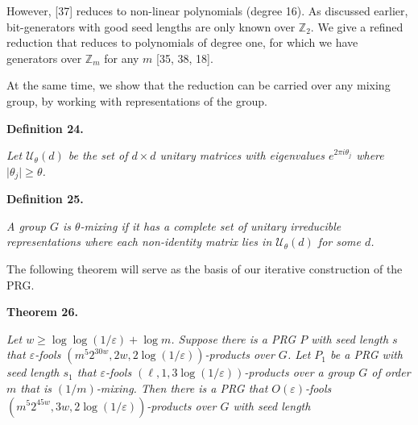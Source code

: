 \documentclass[10pt,a4paper]{article}
\begin{document}
However, [37] reduces to non-linear polynomials (degree 16). As discussed earlier, bit-generators with good seed lengths are only known over $\mathbb{Z}_{2}$. We give a refined reduction that reduces to polynomials of degree one, for which we have generators over $\mathbb{Z}_{m}$ for any $m$ [35, 38, 18].\par




At the same time, we show that the reduction can be carried over any mixing group, by working with representations of the group.\par





\par\medskip\noindent\textbf{
\textbf{Definition 24}\textbf{.}
}\par



\emph{Let $\mathcal{U}_{\theta}(d)$ be the set of $d\times d$ unitary matrices with eigenvalues $e^{2\pi i\theta_{j}}$ where $\lvert\theta_{j}\rvert\geq\theta$.}\par







\par\medskip\noindent\textbf{
\textbf{Definition 25}\textbf{.}
}\par



\emph{A group $G$ is $\theta$-mixing if it has a complete set of unitary
irreducible representations where each non-identity matrix lies in $\mathcal{U}_{\theta}(d)$ for some $d$.}\par






The following theorem will serve as the basis of our iterative construction of the PRG.\par





\par\medskip\noindent\textbf{
\textbf{Theorem 26}\textbf{.}
}\par



\emph{Let $w\geq\log\log(1/\varepsilon)+\log m$.
Suppose there is a PRG $P$ with seed length $s$ that $\varepsilon$-fools $(m^{5}2^{30w},2w,2\log(1/\varepsilon))$-products over $G$.
Let $P_{1}$ be a PRG with seed length $s_{1}$ that $\varepsilon$-fools $(\ell,1,3\log(1/\varepsilon))$-products over a group $G$ of order $m$ that is $(1/m)$-mixing.
Then there is a PRG that $O(\varepsilon)$-fools $(m^{5}2^{45w},3w,2\log(1/\varepsilon))$-products over $G$ with seed length}\par
\end{document}
